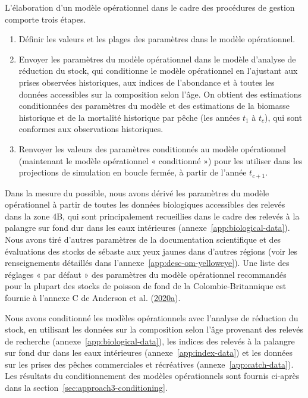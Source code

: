 \documentclass[11pt]{book}
\begin{document}
L'élaboration d'un modèle opérationnel dans le cadre des procédures de gestion comporte trois étapes.
\begin{enumerate}
\def\labelenumi{\arabic{enumi}.}
\item
  Définir les valeurs et les plages des paramètres dans le modèle opérationnel.
\item
  Envoyer les paramètres du modèle opérationnel dans le modèle d'analyse de réduction du stock, qui conditionne le modèle opérationnel en l'ajustant aux prises observées historiques, aux indices de l'abondance et à toutes les données accessibles sur la composition selon l'âge. On obtient des estimations conditionnées des paramètres du modèle et des estimations de la biomasse historique et de la mortalité historique par pêche (les années \(t_1\) à \(t_c\)), qui sont conformes aux observations historiques.
\item
  Renvoyer les valeurs des paramètres conditionnés au modèle opérationnel (maintenant le modèle opérationnel « conditionné ») pour les utiliser dans les projections de simulation en boucle fermée, à partir de l'année \(t_{c+1}\).
\end{enumerate}
Dans la mesure du possible, nous avons dérivé les paramètres du modèle opérationnel à partir de toutes les données biologiques accessibles des relevés dans la zone 4B, qui sont principalement recueillies dans le cadre des relevés à la palangre sur fond dur dans les eaux intérieures (annexe~\ref{app:biological-data}). Nous avons tiré d'autres paramètres de la documentation scientifique et des évaluations des stocks de sébaste aux yeux jaunes dans d'autres régions (voir les renseignements détaillés dans l'annexe~\ref{app:desc-om-yelloweye}). Une liste des réglages « par défaut » des paramètres du modèle opérationnel recommandés pour la plupart des stocks de poisson de fond de la Colombie-Britannique est fournie à l'annexe C de Anderson et al. (\protect\hyperlink{ref-anderson2020gfmp}{2020}\protect\hyperlink{ref-anderson2020gfmp}{a}).

Nous avons conditionné les modèles opérationnels avec l'analyse de réduction du stock, en utilisant les données sur la composition selon l'âge provenant des relevés de recherche (annexe~\ref{app:biological-data}), les indices des relevés à la palangre sur fond dur dans les eaux intérieures (annexe~\ref{app:index-data}) et les données sur les prises des pêches commerciales et récréatives (annexe~\ref{app:catch-data}). Les résultats du conditionnement des modèles opérationnels sont fournis ci-après dans la section~\ref{sec:approach3-conditioning}.
\end{document}
